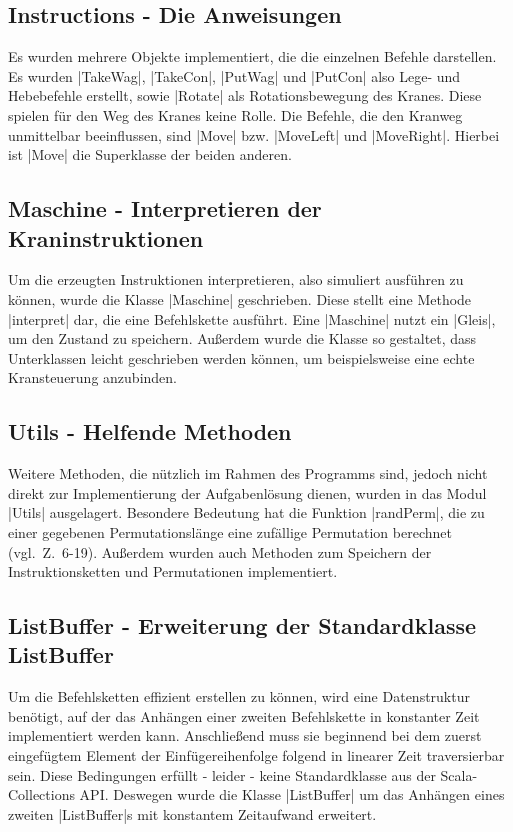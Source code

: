 \subsection{Instructions - Die Anweisungen}
Es wurden mehrere Objekte implementiert, die die einzelnen Befehle darstellen.
Es wurden |TakeWag|, |TakeCon|, |PutWag| und |PutCon| also Lege- und Hebebefehle erstellt, sowie |Rotate| als Rotationsbewegung des Kranes.
Diese spielen für den Weg des Kranes keine Rolle.
Die Befehle, die den Kranweg unmittelbar beeinflussen, sind |Move| bzw. |MoveLeft| und |MoveRight|. Hierbei ist |Move| die Superklasse der beiden anderen.

\subsection{Maschine - Interpretieren der Kraninstruktionen}
Um die erzeugten Instruktionen interpretieren, also simuliert ausführen zu können, wurde die Klasse |Maschine| geschrieben.
Diese stellt eine Methode |interpret| dar, die eine Befehlskette ausführt.
Eine |Maschine| nutzt ein |Gleis|, um den Zustand zu speichern.
Außerdem wurde die Klasse so gestaltet, dass Unterklassen leicht geschrieben werden können, um beispielsweise eine echte Kransteuerung anzubinden.

\subsection{Utils - Helfende Methoden}
 Weitere Methoden, die nützlich im Rahmen des Programms sind, jedoch nicht direkt zur Implementierung der Aufgabenlösung dienen,
  wurden in das Modul |Utils| ausgelagert. Besondere Bedeutung hat die Funktion |randPerm|, die zu einer gegebenen Permutationslänge
  eine zufällige Permutation berechnet (vgl.\ Z.\ 6-19).
 Außerdem wurden auch Methoden zum Speichern der Instruktionsketten und Permutationen implementiert.

\subsection{ListBuffer - Erweiterung der Standardklasse ListBuffer}
 Um die Befehlsketten effizient erstellen zu können, wird eine Datenstruktur benötigt,
  auf der das Anhängen einer zweiten Befehlskette in konstanter Zeit implementiert werden kann.
 Anschließend muss sie beginnend bei dem zuerst eingefügtem Element der Einfügereihenfolge folgend in linearer Zeit traversierbar sein.
 Diese Bedingungen erfüllt - leider - keine Standardklasse aus der Scala-Collections API.
 Deswegen wurde die Klasse |ListBuffer| um das Anhängen eines zweiten |ListBuffer|s mit konstantem Zeitaufwand erweitert.

